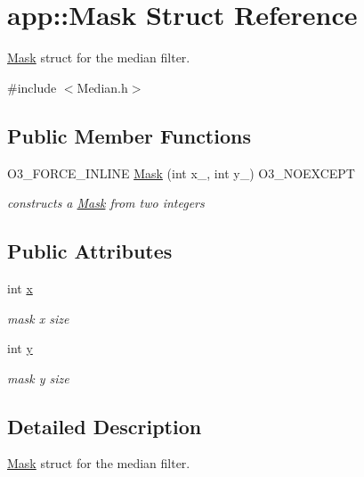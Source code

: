 \hypertarget{structapp_1_1_mask}{}\section{app\+:\+:Mask Struct Reference}
\label{structapp_1_1_mask}


\hyperlink{structapp_1_1_mask}{Mask} struct for the median filter.  




{\ttfamily \#include $<$Median.\+h$>$}

\subsection*{Public Member Functions}
\begin{DoxyCompactItemize}
\item 
O3\+\_\+\+F\+O\+R\+C\+E\+\_\+\+I\+N\+L\+I\+N\+E \hyperlink{structapp_1_1_mask_afd532104fed396f1fa618b29eefb38b5}{Mask} (int x\+\_\+, int y\+\_\+) O3\+\_\+\+N\+O\+E\+X\+C\+E\+P\+T
\begin{DoxyCompactList}\small\item\em constructs a \hyperlink{structapp_1_1_mask}{Mask} from two integers \end{DoxyCompactList}\end{DoxyCompactItemize}
\subsection*{Public Attributes}
\begin{DoxyCompactItemize}
\item 
int \hyperlink{structapp_1_1_mask_a3e6987c38212305a1095905494b9b3cd}{x}
\begin{DoxyCompactList}\small\item\em mask x size \end{DoxyCompactList}\item 
int \hyperlink{structapp_1_1_mask_a10a25ffb3bb2d61e12520e881a3d0b0d}{y}
\begin{DoxyCompactList}\small\item\em mask y size \end{DoxyCompactList}\end{DoxyCompactItemize}


\subsection{Detailed Description}
\hyperlink{structapp_1_1_mask}{Mask} struct for the median filter. 

